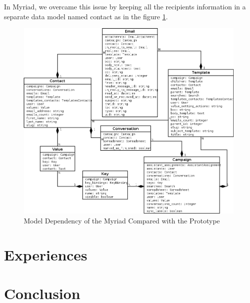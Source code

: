 In Myriad, we overcame this issue by keeping all the recipients information in a separate data model named contact as in the figure \ref{fig:UML_Draw_Final_2}.

\begin{figure}[htbp]
	\centering
	\includegraphics[width=1.00\textwidth]{imgs/UML_Draw_Final_2.png}
	\caption[Model Dependency of the Myriad Compared with the Prototype]{Model Dependency of the Myriad Compared with the Prototype}
	\label{fig:UML_Draw_Final_2}
\end{figure}

\section{Experiences}
\label{sec:5.5:Expr}

\section{Conclusion}
\label{sec:5.4:Conc}

